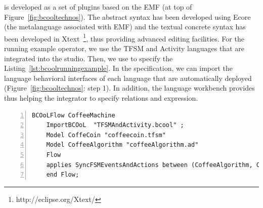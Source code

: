 \bcool is developed as a set of plugins based on the EMF (at top of Figure~\ref{fig:bcooltechnos}). The \bcool abstract syntax has been developed using Ecore (\ie the metalanguage associated with EMF) and the textual concrete syntax has been developed in Xtext~\footnote{http://eclipse.org/Xtext/}, thus providing advanced editing facilities. For the running example operator, we use the TFSM and Activity languages that are integrated into the studio. Then, we use \bcool to specify the Listing~\ref{lst:bcoolrunningexample}. In the \bcool specification, we can import the language behavioral interfaces of each language that are automatically deployed (Figure~\ref{fig:bcooltechnos}: step 1). In addition, the language workbench provides \moccml thus helping the integrator to specify relations and expression.      

	\begin{lstlisting}[language=bflow,
	caption={\bflow specification for the models of the coffee machine},
	label={lst:bflowcoffeemachine}, 
	basicstyle=\scriptsize\ttfamily, backgroundcolor=\color{LGrey}, numbers=left, xleftmargin=2pt]
	BCOoLFlow CoffeeMachine
	ImportBCOoL  "TFSMAndActivity.bcool" ;
	Model CoffeCoin "coffeecoin.tfsm"
	Model CoffeeAlgorithm "coffeeAlgorithm.ad"
	Flow 
	applies SyncFSMEventsAndActions between (CoffeeAlgorithm, CoffeCoin);
	end Flow;
	\end{lstlisting}


